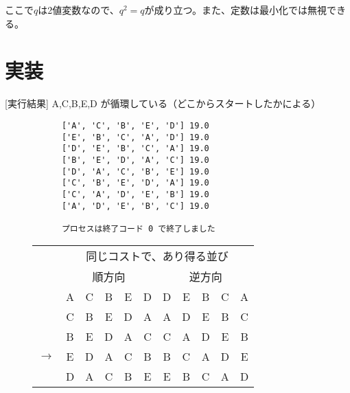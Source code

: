 ここで$q$は2値変数なので、$q^2=q$が成り立つ。また、定数は最小化では無視できる。

\section{実装}



\newpage

[実行結果] A,C,B,E,D が循環している（どこからスタートしたかによる）

\begin{figure}[h]
  \centering
  \begin{minipage}[c]{0.49\columnwidth}
    \centering
    \begin{verbatim}
      ['A', 'C', 'B', 'E', 'D'] 19.0
      ['E', 'B', 'C', 'A', 'D'] 19.0
      ['D', 'E', 'B', 'C', 'A'] 19.0
      ['B', 'E', 'D', 'A', 'C'] 19.0
      ['D', 'A', 'C', 'B', 'E'] 19.0
      ['C', 'B', 'E', 'D', 'A'] 19.0
      ['C', 'A', 'D', 'E', 'B'] 19.0
      ['A', 'D', 'E', 'B', 'C'] 19.0

      プロセスは終了コード 0 で終了しました
    \end{verbatim}
  \end{minipage}
  \begin{minipage}[c]{0.49\columnwidth}
    \centering
    \begin{tabular}{|c|ccccc|ccccc|}\hline
      \multirow{2}{*}{} & \multicolumn{10}{|c|}{同じコストで、あり得る並び} \\\cline{2-11}
       & \multicolumn{5}{|c|}{順方向} & \multicolumn{5}{|c|}{逆方向} \\\hline
       & A & C & B & E & D & D & E & B & C & A \\
       & C & B & E & D & A & A & D & E & B & C \\
       & B & E & D & A & C & C & A & D & E & B \\
      $\rightarrow$ & E & D & A & C & B & B & C & A & D & E \\
       & D & A & C & B & E & E & B & C & A & D \\\hline
     \end{tabular}
  \end{minipage}
  \end{figure}